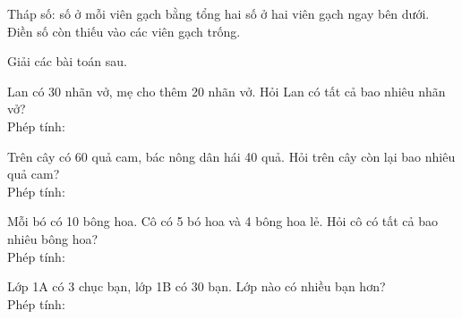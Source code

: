 \documentclass[../main.tex]{subfiles}
\begin{document}
\begin{bt}
    Tháp số: số ở mỗi viên gạch bằng tổng hai số ở hai viên gạch ngay bên dưới. Điền số còn thiếu vào các viên gạch trống.
    \TThinhduoi
    {\centering
    \par}
\end{bt}
\newpage
\begin{bt}
    Giải các bài toán sau.
    \begin{listEX}
        \item Lan có 30 nhãn vở, mẹ cho thêm 20 nhãn vở. Hỏi Lan có tất cả bao nhiêu nhãn vở?\\[6pt]
        Phép tính: \TTcham[6cm]
        \item Trên cây có 60 quả cam, bác nông dân hái 40 quả. Hỏi trên cây còn lại bao nhiêu quả cam?\\[6pt]
        Phép tính: \TTcham[6cm]
        \item Mỗi bó có 10 bông hoa. Cô có 5 bó hoa và 4 bông hoa lẻ. Hỏi cô có tất cả bao nhiêu bông hoa?\\[6pt]
        Phép tính: \TTcham[6cm]
        \item Lớp 1A có 3 chục bạn, lớp 1B có 30 bạn. Lớp nào có nhiều bạn hơn?\\[6pt]
        Phép tính: \TTcham[6cm]
    \end{listEX}
\end{bt}
\end{document}
